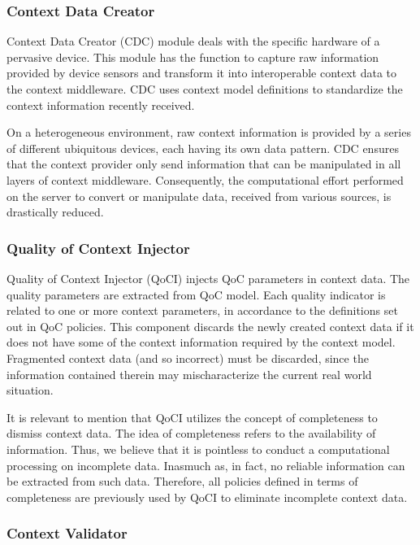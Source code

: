 \documentclass[letterpaper,conference]{IEEEtran}
\begin{document}
\subsubsection{Context Data Creator}

Context Data Creator (CDC) module deals with the specific hardware of a pervasive device.
This module has the function to capture raw information provided by device sensors and 
transform it into interoperable context data to the context middleware. CDC uses context
model definitions to standardize the context information recently received.

On a heterogeneous environment, raw context information is provided by a series of 
different ubiquitous devices, each having its own data pattern. CDC ensures that the 
context provider only send information that can be manipulated in all layers of context
middleware. Consequently, the computational effort performed on the server to convert or
manipulate data, received from various sources, is drastically reduced.

\subsubsection{Quality of Context Injector}

Quality of Context Injector (QoCI) injects QoC parameters in context data. The quality 
parameters are extracted from QoC model. Each quality indicator is related to one or 
more context parameters, in accordance to the definitions set out in QoC policies. This
component discards the newly created context data if it does not have some of the context
information required by the context model. Fragmented context data (and so incorrect) 
must be discarded, since the information contained therein may mischaracterize the 
current real world situation.

It is relevant to mention that QoCI utilizes the concept of completeness to dismiss 
context data. The idea of completeness refers to the availability of information. Thus,
we believe that it is pointless to conduct a computational processing on incomplete data.
Inasmuch as, in fact, no reliable information can be extracted from such data. Therefore,
all policies defined in terms of completeness are previously used by QoCI to eliminate 
incomplete context data.

\subsubsection{Context Validator}
\end{document}
